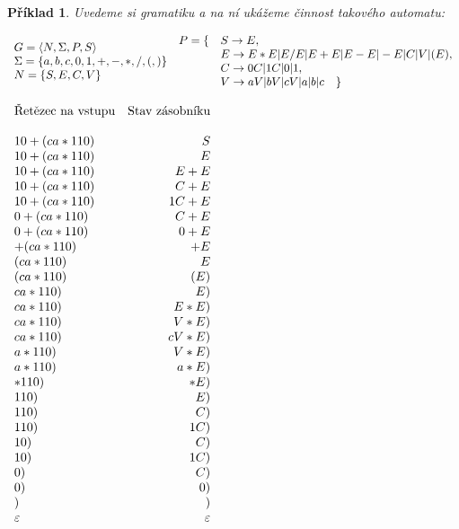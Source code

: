 \documentclass[10pt, a4paper, titlepage]{article}
\theoremstyle{note}
\newtheorem{priklad}{Příklad}
\begin{document}
\begin{priklad}
Uvedeme si gramatiku a na ní ukážeme činnost takového automatu:

$\begin{array}{l}
G=\langle N,\Sigma,P,S \rangle \\
\Sigma = \lbrace a,b,c,0,1,+,-,*,/,(,) \rbrace \\
N = \lbrace S,E,C,V \rbrace \\
\end{array}\\
\begin{array}{l l}
P= \lbrace &S \rightarrow E, \\
& E \rightarrow E*E|E/E|E+E|E-E|-E|C|V|(E), \\
& C \rightarrow 0C|1C|0|1, \\
& V \rightarrow aV|bV|cV|a|b|c \quad \rbrace
\end{array}
$
\begin{center}
$
\begin{array}{l r}
\text{Řetězec na vstupu} & \text{Stav zásobníku} \\
\\
10+(ca*110) & S \\
10+(ca*110) & E \\
10+(ca*110) & E+E \\
10+(ca*110) & C+E \\
10+(ca*110) & 1C+E \\
0+(ca*110) & C+E \\
0+(ca*110) & 0+E \\
+(ca*110) & +E \\
(ca*110) & E \\
(ca*110) & (E) \\
ca*110) & E) \\
ca*110) & E*E) \\
ca*110) & V*E) \\
ca*110) & cV*E) \\
a*110) & V*E) \\
a*110) & a*E) \\
*110) & *E) \\
110) & E) \\
110) & C) \\
110) & 1C) \\
10) & C) \\
10) & 1C) \\
0) & C) \\
0) & 0) \\
) & ) \\
\varepsilon & \varepsilon \\
\end{array}
$
\end{center}
\end{priklad}
\end{document}
